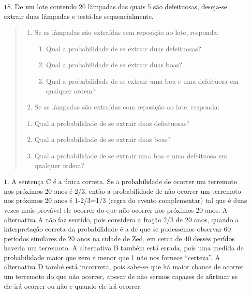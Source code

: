 \(18.\) De um lote contendo 20 lâmpadas das quais 5 são defeituosas, deseja-se extrair duas lâmpadas e testá-las sequencialmente.
\begin{quote}
\begin{enumerate}
\item {} 
Se as lâmpadas são extraídas sem reposição ao lote, responda:
\begin{enumerate}
\item {} 
Qual a probabilidade de se extrair duas defeituosas?

\item {} 
Qual a probabilidade de se extrair duas boas?

\item {} 
Qual a probabilidade de se extrair uma boa e uma defeituosa em qualquer ordem?

\end{enumerate}

\item {} 
Se as lâmpadas são extraídas com reposição ao lote, responda:

\end{enumerate}
\begin{enumerate}
\item {} 
Qual a probabilidade de se extrair duas defeituosas?

\item {} 
Qual a probabilidade de se extrair duas boas?

\item {} 
Qual a probabilidade de se extrair uma boa e uma defeituosa em qualquer ordem?

\end{enumerate}
\end{quote}


\(1.\) A sentença C é a única correta. Se a probabilidade de ocorrer um terremoto nos próximos 20 anos é 2/3, então a probabilidade de não ocorrer um terremoto nos próximos 20 anos é 1-2/3=1/3 (regra do evento complementar) tal que é duas vezes mais provável ele ocorrer do que não ocorrer nos próximos 20 anos. A alternativa A não faz sentido, pois considera a fração 2/3 de 20 anos, quando a interpretação correta da probabilidade é a de que se pudessemos observar 60 períodos similares de 20 anos na cidade de Zed, em cerca de 40 desses perídos haveria um terremoto. A alternativa B também está errada, pois uma medida de probabilidade maior que zero e menor que 1 não nos fornece “certeza”. A alternativa D també está incorrreta, pois sabe-se que há maior chance de ocorrer um terremoto do que não ocorrer, apesar de não sermos capazes de afirtmar se ele irá ocorrer ou não e quando ele irá ocorrer.

